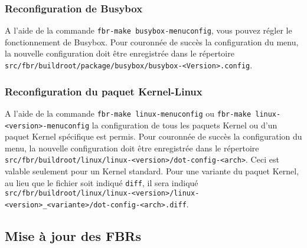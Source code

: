 \subsubsection{Reconfiguration de Busybox}

A l'aide de la commande \texttt{fbr-make busybox-menuconfig}, vous pouvez régler
le fonctionnement de Busybox. Pour couronnée de succès la configuration du menu,
la nouvelle configuration doit être enregistrée dans le répertoire
\texttt{src/fbr/buildroot/package/busybox/busybox-<Version>.config}.


\subsubsection{Reconfiguration du paquet Kernel-Linux}

A l'aide de la commande \texttt{fbr-make linux-menuconfig} ou
\texttt{fbr-make linux-<version>-menuconfig} la configuration de tous les paquets
Kernel ou d'un paquet Kernel spécifique est permis. Pour couronnée de succès
la configuration du menu, la nouvelle configuration doit être enregistrée dans
le répertoire \texttt{src/fbr/buildroot/linux/linux-<version>/dot-config-<arch>}.
Ceci est valable seulement pour un Kernel standard. Pour une variante du paquet
Kernel, au lieu que le fichier soit indiqué \texttt{diff}, il sera indiqué
\texttt{src/fbr/buildroot/linux/linux-<version>/linux-<version>\_<variante>/dot-config-<arch>.diff}.


\subsection{Mise à jour des FBRs}

